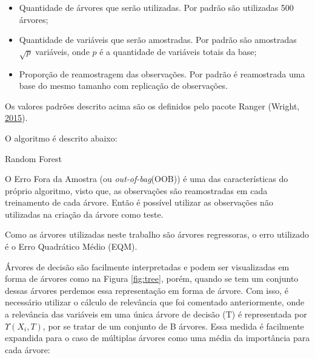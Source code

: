 \documentclass[
	12pt,				%
	a4paper,		%
	oneside,    %
	chapter=TITLE,		   %
	section=TITLE,		   %
	subsection=TITLE,	   %
	subsubsection=TITLE, %
	english,			%
	french,				%
	spanish,			%
	brazil,				%
]{abntex2}
\begin{document}
\begin{itemize}
\item
  Quantidade de árvores que serão utilizadas. Por padrão são utilizadas
  500 árvores;
\item
  Quantidade de variáveis que serão amostradas. Por padrão são
  amostradas \(\sqrt{p}\) variáveis, onde \(p\) é a quantidade de
  variáveis totais da base;
\item
  Proporção de reamostragem das observações. Por padrão é reamostrada
  uma base do mesmo tamanho com replicação de observações.
\end{itemize}

Os valores padrões descrito acima são os definidos pelo pacote Ranger
(Wright, \protect\hyperlink{ref-wright2015ranger}{2015}).

O algoritmo é descrito abaixo:

\begin{algorithm}[H]

\caption{Random Forest}

\end{algorithm}

O Erro Fora da Amostra (ou \emph{out-of-bag}(OOB)) é uma das
características do próprio algoritmo, visto que, as observações são
reamostradas em cada treinamento de cada árvore. Então é possível
utilizar as observações não utilizadas na criação da árvore como teste.

Como as árvores utilizadas neste trabalho são árvores regressoras, o
erro utilizado é o Erro Quadrático Médio (EQM).

Árvores de decisão são facilmente interpretadas e podem ser visualizadas
em forma de árvores como na Figura \ref{fig:tree}, porém, quando se tem
um conjunto dessas árvores perdemos essa representação em forma de
árvore. Com isso, é necessário utilizar o cálculo de relevância que foi
comentado anteriormente, onde a relevância das variáveis em uma única
árvore de decisão (T) é representada por \(\Upsilon(X_i, T)\), por se
tratar de um conjunto de B árvores. Essa medida é facilmente expandida
para o caso de múltiplas árvores como uma média da importância para cada
árvore:
\end{document}
